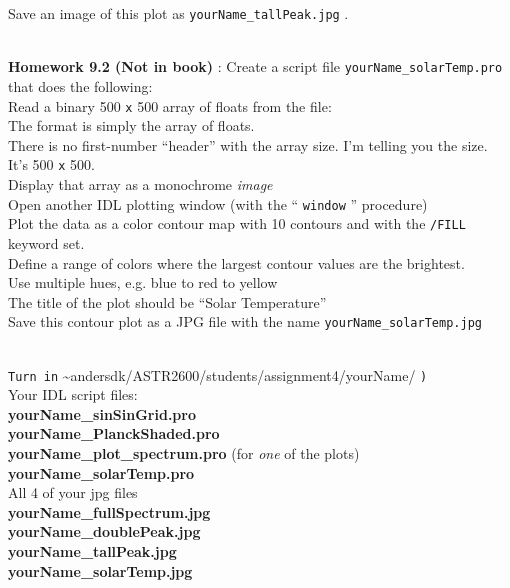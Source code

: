 \documentclass{article}
\begin{document}
\begin{spacing}{1.0}
  Save an image of this plot as  \verb|yourName_tallPeak.jpg| . \\ 
  \par \\ 
  \textbf{Homework 9.2 (Not in book)} : Create a script file  \verb|yourName_solarTemp.pro|  that does the following: \\ 
  Read a binary 500 \verb|x| 500 array of floats from the file: \\ 
  The format is simply the array of floats.   \\ 
    There is no first-number “header” with the array size.   I’m telling you the size.   It’s 500  \verb|x|  500. \\ 
  Display that array as a monochrome  \emph{image} \\ 
  Open another IDL plotting window (with the “ \verb|window| ” procedure) \\ 
  Plot the data as a color contour map with 10 contours and with the  \verb|/FILL|  keyword set. \\ 
    Define a range of colors where the largest contour values are the brightest.    \\ 
    Use multiple hues, e.g. blue to red to yellow \\ 
  The title of the plot should be “Solar Temperature” \\ 
  Save this contour plot as a JPG file with the name  \verb|yourName_solarTemp.jpg| \\ 
  \par \\ 
  \verb|Turn in| \textasciitilde{}andersdk/ASTR2600/students/assignment4/yourName/ \verb|)| \\ 
  Your IDL script files:   \\ 
  \textbf{yourName\_sinSinGrid.pro} \\ 
  \textbf{yourName\_PlanckShaded.pro} \\ 
  \textbf{yourName\_plot\_spectrum.pro}   (for  \emph{one}  of the plots) \\ 
  \textbf{yourName\_solarTemp.pro} \\ 
  All 4 of your jpg files \\ 
  \textbf{yourName\_fullSpectrum.jpg} \\ 
  \textbf{yourName\_doublePeak.jpg} \\ 
  \textbf{yourName\_tallPeak.jpg} \\ 
  \textbf{yourName\_solarTemp.jpg} \\ 
 
 
 \end{spacing}
 
\end{document}
